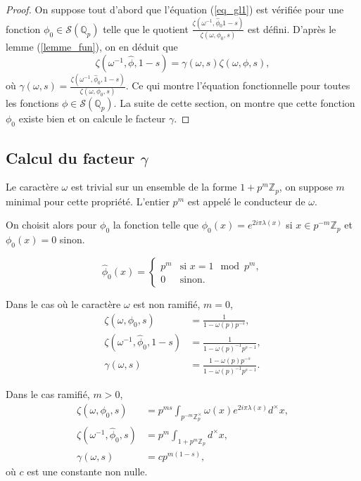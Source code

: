 \begin{proof}
On suppose tout d'abord que l'équation (\ref{eq_gl1}) est vérifiée pour une fonction $\phi_0 \in \mathcal{S}(\mathbb{Q}_p)$ telle que le quotient $\frac{\zeta(\omega^{-1}, \hat{\phi}_0 1-s)}{\zeta(\omega, \phi_0, s)}$ est défini. D'après le lemme (\ref{lemme_fun}), on en déduit que
\begin{equation}
\zeta(\omega^{-1}, \hat{\phi}, 1-s) = \gamma(\omega,s)\zeta(\omega, \phi, s),
\end{equation}
où $\gamma(\omega,s) = \frac{\zeta(\omega^{-1}, \hat{\phi}_0, 1-s)}{\zeta(\omega, \phi_0, s)}$. Ce qui montre l'équation fonctionnelle pour toutes les fonctions $\phi \in \mathcal{S}(\mathbb{Q}_p)$. La suite de cette section, on montre que cette fonction $\phi_0$ existe bien et on calcule le facteur $\gamma$.
\end{proof}

\subsection{Calcul du facteur $\gamma$}

Le caractère $\omega$ est trivial sur un ensemble de la forme $1+p^m \mathbb{Z}_p$, on suppose $m$ minimal pour cette propriété. L'entier $p^m$ est appelé le conducteur de $\omega$.

On choisit alors pour $\phi_0$ la fonction telle que $\phi_0(x)=e^{2i\pi \lambda(x)}$ si $x \in p^{-m}\mathbb{Z}_p$ et $\phi_0(x)=0$ sinon.

\begin{lemme}
\begin{equation}
\hat{\phi}_0(x) = \left\{
    \begin{array}{ll}
        p^m & \mbox{si } x = 1 \mod p^m, \\
        0 & \mbox{sinon.}
    \end{array}
\right.
\end{equation}
\end{lemme}

Dans le cas où le caractère $\omega$ est non ramifié, $m=0$,
\begin{align}
\zeta(\omega, \phi_0, s)&=\frac{1}{1-\omega(p)p^{-s}},\\
\zeta(\omega^{-1}, \hat{\phi}_0, 1-s) &= \frac{1}{1-\omega(p)^{-1}p^{s-1}}, \\
\gamma(\omega,s) &= \frac{1-\omega(p)p^{-s}}{1-\omega(p)^{-1}p^{s-1}}.
\end{align}

Dans le cas ramifié, $m > 0$,
\begin{align}
\zeta(\omega, \phi_0, s) &= p^{ms}\int_{p^{-m}\mathbb{Z}_p^\times} \omega(x)e^{2i\pi \lambda(x)}d^\times x, \\
\zeta(\omega^{-1}, \hat{\phi}_0, s) &= p^m\int_{1+p^{m}\mathbb{Z}_p} d^\times x, \\
\gamma(\omega,s) &= c p^{m(1-s)},
\end{align}
où $c$ est une constante non nulle.

